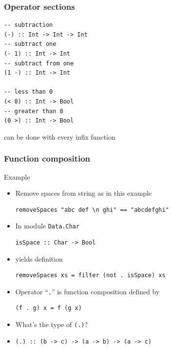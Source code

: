 \documentclass{beamer}
\begin{document}
\begin{frame}[fragile]
  \frametitle{Operator sections}
\begin{verbatim}
-- subtraction
(-) :: Int -> Int -> Int
-- subtract one
(- 1) :: Int -> Int
-- subtract from one
(1 -) :: Int -> Int

-- less than 0
(< 0) :: Int -> Bool
-- greater than 0
(0 >) :: Int -> Bool
\end{verbatim}
  can be done with every infix function
\end{frame}
\begin{frame}[fragile]
  \frametitle{Function composition}
  \begin{block}{Example}
    \begin{itemize}
    \item<+-> Remove spaces from string as in this
      example
\begin{verbatim}
removeSpaces "abc def \n ghi" == "abcdefghi"
\end{verbatim}
    \item<+-> In module \texttt{Data.Char}
\begin{verbatim}
isSpace :: Char -> Bool
\end{verbatim}
    \item<+-> yields definition
\begin{verbatim}
removeSpaces xs = filter (not . isSpace) xs
\end{verbatim}
    \item<+-> Operator ``\texttt{.}'' is function composition defined by
\begin{verbatim}
(f . g) x = f (g x)
\end{verbatim}
    \item<+-> What's the type of \texttt{(.)}?
    \item<+-> \texttt{(.) :: (b -> c) -> (a -> b) -> (a -> c)}
    \end{itemize}
  \end{block}
\end{frame}
\end{document}
